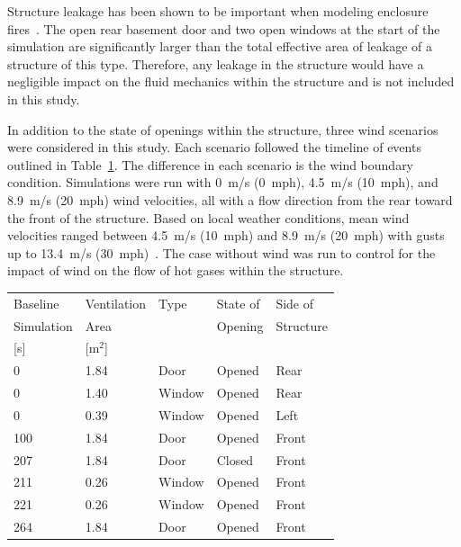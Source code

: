 \documentclass[12pt,oneside]{book}
\begin{document}
Structure leakage has been shown to be important when modeling enclosure fires~\cite{beal2009}. The open rear basement door and two open windows at the start of the simulation are significantly larger than the total effective area of leakage of a structure of this type. Therefore, any leakage in the structure would have a negligible impact on the fluid mechanics within the structure and is not included in this study.

In addition to the state of openings within the structure, three wind scenarios were considered in this study. Each scenario followed the timeline of events outlined in Table~\ref{tab:vents}. The difference in each scenario is the wind boundary condition. Simulations were run with 0~m/s (0~mph), 4.5~m/s (10~mph), and 8.9~m/s (20~mph) wind velocities, all with a flow direction from the rear toward the front of the structure. Based on local weather conditions, mean wind velocities ranged between 4.5~m/s (10~mph) and 8.9~m/s (20~mph) with gusts up to 13.4~m/s (30~mph)~\cite{PGCounty2013}. The case without wind was run to control for the impact of wind on the flow of hot gases within the structure.

\begin{table}
\centering
{}\label{tab:vents}
\begin{tabular}{lllll}
\toprule[1.5pt]
Baseline     &   Ventilation   &  Type       & State of       &  Side of  \\
Simulation  &  Area             &                 & Opening     &  Structure  \\
{[s]}             &  {[m$^2$]}     &                 &                    &                  \\
\midrule
0               &  1.84             &  Door        &  Opened     &  Rear  \\
0               &  1.40             &  Window      &  Opened     &  Rear  \\
0               &  0.39             &  Window      &  Opened     &  Left   \\
100             &  1.84             &  Door        &  Opened     &  Front   \\
207             &  1.84             &  Door        &  Closed     &  Front   \\
211             &  0.26             &  Window      &  Opened     &  Front   \\
221             &  0.26             &  Window      &  Opened     &  Front  \\
264             &  1.84             &  Door        &  Opened     & Front  \\
\bottomrule[1.25pt]
\end{tabular}\par
\footnotesize
\normalsize
\end{table}
\end{document}
